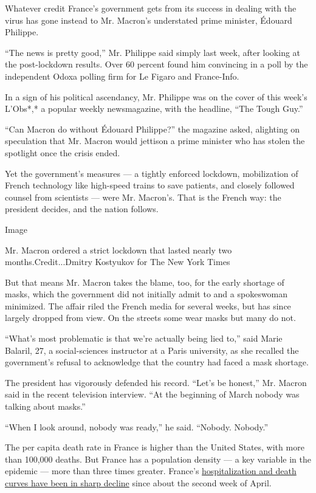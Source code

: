 Whatever credit France's government gets from its success in dealing
with the virus has gone instead to Mr. Macron's understated prime
minister, Édouard Philippe.

``The news is pretty good,'' Mr. Philippe said simply last week, after
looking at the post-lockdown results. Over 60 percent found him
convincing in a poll by the independent Odoxa polling firm for Le Figaro
and France-Info.

In a sign of his political ascendancy, Mr. Philippe was on the cover of
this week's L'Obs*,* a popular weekly newsmagazine, with the headline,
``The Tough Guy.''

``Can Macron do without Édouard Philippe?'' the magazine asked,
alighting on speculation that Mr. Macron would jettison a prime minister
who has stolen the spotlight once the crisis ended.

Yet the government's measures --- a tightly enforced lockdown,
mobilization of French technology like high-speed trains to save
patients, and closely followed counsel from scientists --- were Mr.
Macron's. That is the French way: the president decides, and the nation
follows.

Image

Mr. Macron ordered a strict lockdown that lasted nearly two
months.Credit...Dmitry Kostyukov for The New York Times

But that means Mr. Macron takes the blame, too, for the early shortage
of masks, which the government did not initially admit to and a
spokeswoman minimized. The affair riled the French media for several
weeks, but has since largely dropped from view. On the streets some wear
masks but many do not.

``What's most problematic is that we're actually being lied to,'' said
Marie Balaril, 27, a social-sciences instructor at a Paris university,
as she recalled the government's refusal to acknowledge that the country
had faced a mask shortage.

The president has vigorously defended his record. ``Let's be honest,''
Mr. Macron said in the recent television interview. ``At the beginning
of March nobody was talking about masks.''

``When I look around, nobody was ready,'' he said. ``Nobody. Nobody.''

The per capita death rate in France is higher than the United States,
with more than 100,000 deaths. But France has a population density --- a
key variable in the epidemic --- more than three times greater. France's
\href{https://www.nytimes.com/2020/05/20/world/europe/virus-paris-reopening.html?action=click\&module=RelatedLinks\&pgtype=Article}{hospitalization
and death curves have been in sharp decline} since about the second week
of April.

